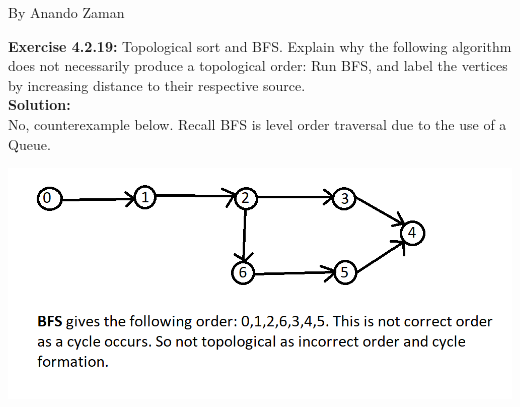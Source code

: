 \documentclass[11pt,fleqn]{article}
\begin{document}
By Anando Zaman

\textbf{Exercise 4.2.19:} Topological sort and BFS. Explain why the following algorithm does not necessarily
produce a topological order: Run BFS, and label the vertices by increasing distance
to their respective source.\\

\textbf{Solution:}\\
No, counterexample below. Recall BFS is level order traversal due to the use of a Queue.

\begin{center}
	\includegraphics[scale=.6]{4.2.19.png}
\end{center}


	
\end{document}
